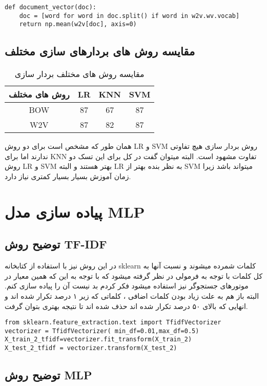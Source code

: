\documentclass{article}[12pt]
\begin{document}
\begin{verbatim}
def document_vector(doc):
    doc = [word for word in doc.split() if word in w2v.wv.vocab]
    return np.mean(w2v[doc], axis=0)
    \end{verbatim}
    
\subsection{مقایسه روش های بردارهای سازی مختلف}

\begin{table}[!hbtp]
\centering
\caption{مقایسه روش های مختلف بردار سازی }
\label{tab:compare}
\begin{tabular}{cccc}
\hline
روش های مختلف & LR & KNN & SVM \\ \hline
BOW           & 87 & 67  & 87  \\ \hline
W2V           & 87 & 82  & 87 
\end{tabular}
\end{table}
همان طور که مشخص است برای دو روش LR و SVM روش بردار سازی هیچ تفاوتی ندارند اما برای KNN تفاوت مشهود است. 
البته میتوان گفت در کل برای این تسک دو روش LR و SVM بهتر هستند و البته LR به نظر بنده بهتر از SVM میتواند باشد زیرا زمان آموزش بسیار بسیار کمتری نیاز دارد. 


\section{پیاده سازی مدل MLP}
\subsection{توضیح روش TF-IDF}

در این روش نیز با استفاده از کتابخانه sklearn کلمات شمرده میشوند و نسبت آنها به کل کلمات با توجه به فرمولی در نظر گرفته میشود که با توجه به این که همین معیار در موتورهای جستجوگر نیز استفاده میشود فکر کردم بد نیست آن را پیاده سازی کنم. 
البته باز هم به علت زیاد بودن کلمات اضافی
، کلماتی که زیر ۱ درصد تکرار شده اند و انهایی که بالای ۵۰ درصد تکرار شده اند حذف شده اند تا نتیجه بهتری بتوان گرفت. 
\begin{verbatim}
from sklearn.feature_extraction.text import TfidfVectorizer
vectorizer = TfidfVectorizer( min_df=0.01,max_df=0.5)
X_train_2_tfidf=vectorizer.fit_transform(X_train_2)
X_test_2_tfidf = vectorizer.transform(X_test_2)
\end{verbatim}

\subsection{توضیح روش MLP}
\end{document}
